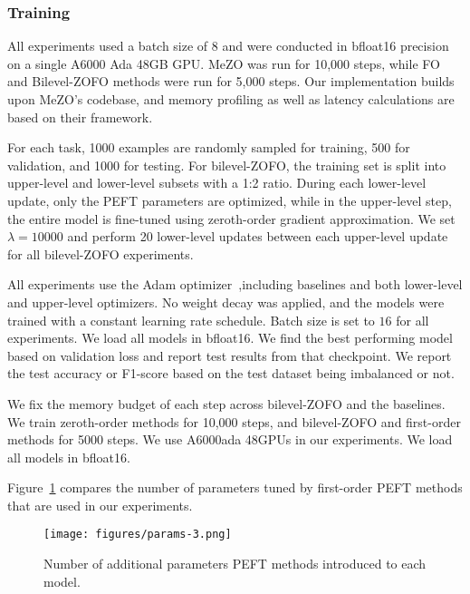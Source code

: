 \subsubsection{Training}\label{app:sigle-task-training}

All experiments used a batch size of 8 and were conducted in bfloat16 precision on a single A6000 Ada 48GB GPU. MeZO was run for 10,000 steps, while FO and Bilevel-ZOFO methods were run for 5,000 steps. Our implementation builds upon MeZO’s codebase, and memory profiling as well as latency calculations are based on their framework.

For each task, 1000 examples are randomly sampled for training, 500 for validation, and 1000 for testing. For bilevel-ZOFO, the training set is split into upper-level and lower-level subsets with a 1:2 ratio. During each lower-level update, only the PEFT parameters are optimized, while in the upper-level step, the entire model is fine-tuned using zeroth-order gradient approximation. We set $\lambda=10000$ and perform 20 lower-level updates between each upper-level update for all bilevel-ZOFO experiments.

All experiments use the Adam optimizer~\citep{AdamKingmaB14},including baselines and both lower-level and upper-level optimizers. No weight decay was applied, and the models were trained with a constant learning rate schedule. Batch size is set to $16$ for all experiments. We load all models in bfloat16. We find the best performing model based on validation loss and report test results from that checkpoint. We report the test accuracy or F1-score based on the test dataset being imbalanced or not.

We fix the memory budget of each step across bilevel-ZOFO and the baselines. We train zeroth-order methods for 10,000 steps, and bilevel-ZOFO and first-order methods for 5000 steps. We use A6000ada 48GPUs in our experiments. We load all models in bfloat16.

Figure~\ref{fig:low_source_increases} compares the number of parameters tuned by first-order PEFT methods that are used in our experiments.

\begin{figure}[!t]
    \centering
    \texttt{[image: figures/params-3.png]}
    \caption{Number of additional parameters PEFT methods introduced to each model.}
    \label{fig:low_source_increases}
\end{figure}



